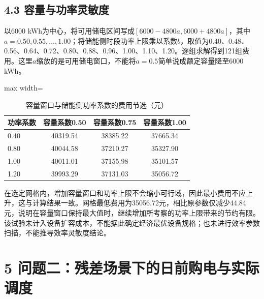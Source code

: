 \documentclass[UTF8,a4paper,zihao=-4,fontset=windows]{ctexart}
\begin{document}
\subsection{4.3 容量与功率灵敏度}
以6000 kWh为中心，将可用储电区间写成$[6000-4800a,6000+4800a]$，其中$a=0.50,0.55,\ldots,1.00$；将储能侧时段功率上限乘以系数$b$，取值为0.40、0.48、0.56、0.64、0.72、0.80、0.88、0.96、1.00、1.10、1.20。逐组求解得到121组费用。这里$a$缩放的是可用储电窗口，不能将$a=0.5$简单说成额定容量降至6000 kWh。
\par
\begin{table}[H]\centering\caption{容量窗口与储能侧功率系数的费用节选（元）}
\fontsize{9.5}{12}\selectfont\setlength{\tabcolsep}{4pt}\renewcommand{\arraystretch}{1.12}
\begin{adjustbox}{max width=\linewidth}\begin{tabular}{lccc}\toprule
功率系数 & 容量系数0.50 & 容量系数0.75 & 容量系数1.00\\\midrule
0.40 & 40319.54 & 38385.22 & 37665.34\\
0.80 & 40044.58 & 37210.27 & 35327.90\\
1.00 & 40011.01 & 37155.98 & 35101.57\\
1.20 & 39993.29 & 37131.03 & 35056.72\\
\bottomrule\end{tabular}\end{adjustbox}\end{table}
在选定网格内，增加容量窗口和功率上限不会缩小可行域，因此最小费用不应上升，这与计算结果一致。网格最低费用为35056.72元，相比原参数仅减少44.84元，说明在容量窗口保持最大值时，继续增加所考察的功率上限带来的节约有限。该试验未计入设备扩容成本，不能据此确定经济最优设备规格；也未进行效率参数扫描，不能推导效率灵敏度结论。
\par
\section{5 问题二：残差场景下的日前购电与实际调度}
\end{document}
